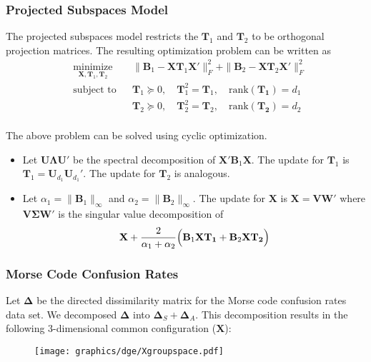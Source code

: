 \documentclass[professionalfonts, hyperref={pdfpagelabels=false,
  colorlinks=true, linkcolor=purple}]{beamer}
\begin{document}
\begin{frame}
  \frametitle{Projected Subspaces Model}
  The projected subspaces model restricts the $\mathbf{T}_1$ and
  $\mathbf{T}_2$ to
  be orthogonal projection matrices. The resulting optimization
  problem can be written as
  \begin{equation}
  \label{eq:5}
	\begin{aligned}
	& \underset{\mathbf{X}, \mathbf{T}_1, \mathbf{T}_2}{\text{minimize}}
	& & \| \mathbf{B}_1 - \mathbf{X}
\mathbf{T}_1 \mathbf{X}' \|_F^2 +  \| \mathbf{B}_2 - \mathbf{X}
\mathbf{T}_2 \mathbf{X}' \|_F^2 \\
	& \text{subject to}
	& & \mathbf{T}_1 \succeq 0, \quad \mathbf{T}_1^2 = \mathbf{T}_1,
    \quad \mathrm{rank}(\mathbf{T_1}) = d_1 \\
	& & & \mathbf{T}_2 \succeq 0, \quad \mathbf{T}_2^2 = \mathbf{T}_2,
    \quad \mathrm{rank}(\mathbf{T_2}) = d_2 \\
	\end{aligned}
\end{equation}

The above problem can be solved using cyclic optimization. 
\begin{itemize}
\item Let $\mathbf{U} \bm{\Lambda} \mathbf{U}'$ be the spectral
  decomposition of $\mathbf{X}' \mathbf{B}_1 \mathbf{X}$. The update
  for $\mathbf{T}_1$ is $\mathbf{T}_1 = \mathbf{U}_{d_1}
  \mathbf{U}_{d_1}'$. The update for $\mathbf{T}_2$ is analogous.
\item Let $\alpha_1 = \| \mathbf{B}_1 \|_{\infty}$ and $\alpha_2 = \|
  \mathbf{B}_2 \|_{\infty}$. The update for
  $\mathbf{X}$ is $\mathbf{X} = \mathbf{V} \mathbf{W}'$
  \cite{kiers90:_major} where $\mathbf{V} \bm{\Sigma} \mathbf{W}'$ is
  the singular value decomposition of
  \begin{equation}
    \label{eq:7}
    \mathbf{X} + \frac{2}{\alpha_1 + \alpha_2} \Bigl( 
    \mathbf{B}_1 \mathbf{X} \mathbf{T_1} + \mathbf{B}_2 \mathbf{X}
    \mathbf{T_2} \Bigr)
  \end{equation}
\end{itemize}
\end{frame}

\begin{frame}
  \frametitle{Morse Code Confusion Rates} 
  Let $\bm{\Delta}$ be the directed dissimilarity matrix for the
  Morse code confusion rates data set. We decomposed $\bm{\Delta}$
  into $\bm{\Delta}_S + \bm{\Delta}_A$. This decomposition results in
  the following 3-dimensional common configuration ($\mathbf{X}$): 
  \begin{figure}[hbtp]
    \centering
    \texttt{[image: graphics/dge/Xgroupspace.pdf]}
    \label{fig:morsecode3d}
  \end{figure}
\end{frame}
\end{document}
